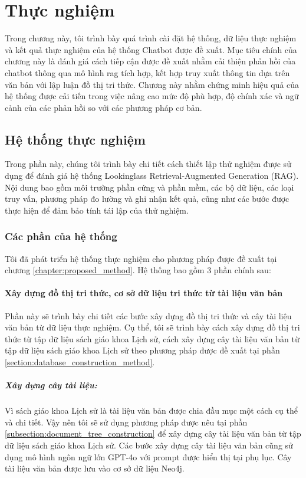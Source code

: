 \chapter{Thực nghiệm}
\label{chap:experiment}
Trong chương này, tôi trình bày quá trình cài đặt hệ thống, dữ liệu thực nghiệm và kết quả thực nghiệm của hệ thống Chatbot được đề xuất. Mục tiêu chính của chương này là đánh giá cách tiếp cận được đề xuất nhằm cải thiện phản hồi của chatbot thông qua mô hình \gls{rag} tích hợp, kết hợp truy xuất thông tin dựa trên văn bản với lập luận đồ thị tri thức. Chương này nhằm chứng minh hiệu quả của hệ thống được cải tiến trong việc nâng cao mức độ phù hợp, độ chính xác và ngữ cảnh của các phản hồi so với các phương pháp cơ bản.
\section{Hệ thống thực nghiệm}
\label{sec:experimental_setup}
Trong phần này, chúng tôi trình bày chi tiết cách thiết lập thử nghiệm được sử dụng để đánh giá hệ thống Lookinglass Retrieval-Augmented Generation (RAG). Nội dung bao gồm môi trường phần cứng và phần mềm, các bộ dữ liệu, các loại truy vấn, phương pháp đo lường và ghi nhận kết quả, cũng như các bước được thực hiện để đảm bảo tính tái lập của thử nghiệm.
\subsection{Các phần của hệ thống}
Tôi đã phát triển hệ thống thực nghiệm cho phương pháp được đề xuất tại chương \ref{chapter:proposed_method}. Hệ thống bao gồm 3 phần chính sau:
\subsubsection{Xây dựng đồ thị tri thức, cơ sở dữ liệu tri thức từ tài liệu văn bản}
\label{section:knowledge_graph_construction_experiment}
Phần này sẽ trình bày chi tiết các bước xây dựng đồ thị tri thức và cây tài liệu văn bản từ dữ liệu thực nghiệm. Cụ thể, tôi sẽ trình bày cách xây dựng đồ thị tri thức từ tập dữ liệu sách giáo khoa Lịch sử, cách xây dựng cây tài liệu văn bản từ tập dữ liệu sách giáo khoa Lịch sử theo phương pháp được đề xuất tại phần \ref{section:database_construction_method}.


\paragraph{Xây dựng cây tài liệu:} Vì sách giáo khoa Lịch sử là tài liệu văn bản được chia đầu mục một cách cụ thể và chi tiết. Vậy nên tôi sẽ sử dụng phương pháp được nêu tại phần \ref{subsection:document_tree_construction} để xây dựng cây tài liệu văn bản từ tập dữ liệu sách giáo khoa Lịch sử. Các bước xây dựng cây tài liệu văn bản cũng sử dụng mô hình ngôn ngữ lớn GPT-4o với prompt được hiển thị tại phụ lục. Cây tài liệu văn bản được lưu vào cơ sở dữ liệu Neo4j.


